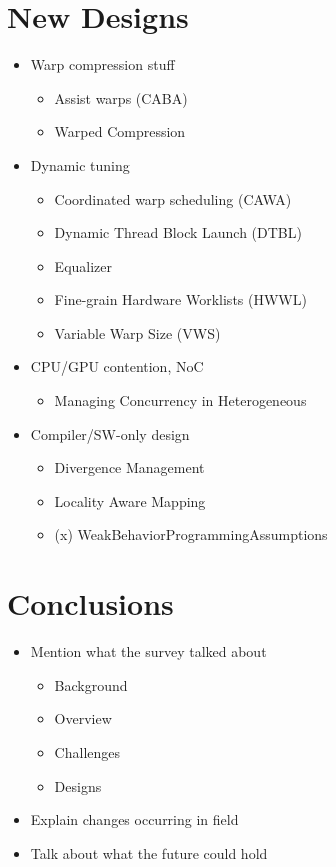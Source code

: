 \documentclass[prodmode,acmtecs]{acmsmall} %
\begin{document}
\section{New Designs} \label{sec:research}
\begin{itemize}
\item Warp compression stuff
  \begin{itemize}
  \item Assist warps (CABA)
  \item Warped Compression
  \end{itemize}
\item Dynamic tuning
  \begin{itemize}
  \item Coordinated warp scheduling (CAWA)
  \item Dynamic Thread Block Launch (DTBL)
  \item Equalizer
  \item Fine-grain Hardware Worklists (HWWL)
  \item Variable Warp Size (VWS)
  \end{itemize}
\item CPU/GPU contention, NoC
  \begin{itemize}
  \item Managing Concurrency in Heterogeneous
  \end{itemize}
\item Compiler/SW-only design
  \begin{itemize}
  \item Divergence Management
  \item Locality Aware Mapping
  \item (x) WeakBehaviorProgrammingAssumptions
  \end{itemize}
\end{itemize}

\section{Conclusions} \label{sec:conclusions}
\begin{itemize}
\item Mention what the survey talked about
  \begin{itemize}
  \item Background
  \item Overview
  \item Challenges
  \item Designs
  \end{itemize}
\item Explain changes occurring in field
\item Talk about what the future could hold
\end{itemize}
\end{document}
